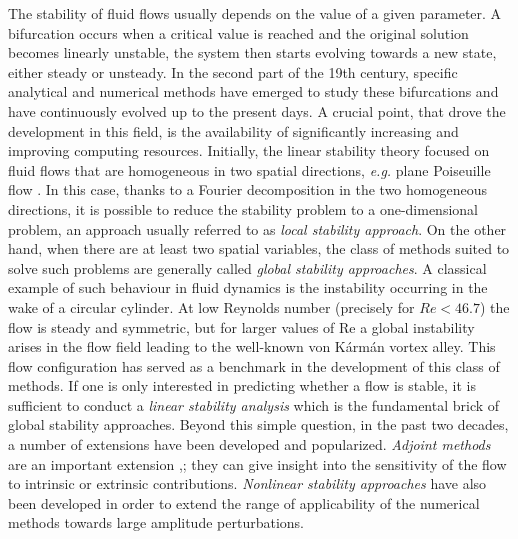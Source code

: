 \documentclass[twocolumn,10pt]{asme2ej}
\begin{document}
The stability of fluid flows usually depends on the value of a given parameter.
A bifurcation occurs when a critical value is reached and the original solution becomes linearly unstable, the system then starts evolving towards a new state, either steady or unsteady. 
In the second part of the 19th century, specific analytical and numerical methods have emerged to study these bifurcations and have continuously evolved up to the present days. 
A crucial point, that drove the development in this field, is the availability of significantly increasing and improving computing resources. 
Initially, the linear stability theory focused on fluid flows that are homogeneous in two spatial directions, \textit{e.g.} plane Poiseuille flow \cite{Dreid2004}. In this case, thanks to a Fourier decomposition in the two homogeneous directions, it is possible to reduce the stability problem to a one-dimensional problem, an approach usually referred to as {\em local stability approach}.
On the other hand,  when there are at least two spatial variables, the class of methods suited to solve such problems are generally called {\em global stability approaches}.
A classical example of such behaviour in fluid dynamics is the instability occurring in the wake of a circular cylinder. At low Reynolds number (precisely for $Re < 46.7$) the flow is steady and symmetric, but for larger values of Re a global instability arises in the flow field leading to the well-known von K\'arm\'an vortex alley. 
This flow configuration has served as a benchmark in the development of this class of methods.  
If one is only interested in predicting whether a flow is stable, it is sufficient to conduct a {\em linear stability analysis} which is the fundamental brick of global stability approaches. 
Beyond this simple question, in the past two decades, a number of extensions have been developed and popularized.
{\em Adjoint methods} are an important extension \cite{GiannettiLuchini},\cite{Marquet}; they can give insight into the sensitivity of the flow to intrinsic or extrinsic contributions. 
{\em Nonlinear stability approaches} \cite{SippLebedev} \cite{MLugo2014} have also been developed in order to extend the range of applicability of the numerical methods towards large amplitude perturbations.
\end{document}
